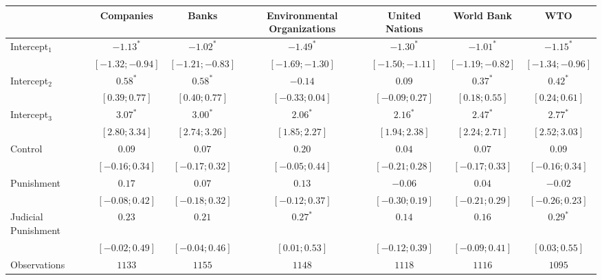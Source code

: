 \begin{table}[h]
\begin{center}
\begin{threeparttable}
\begin{tabular}{l c c c c c c}
\hline
 & Companies & Banks & Environmental Organizations & United Nations & World Bank & WTO \\
\hline
Intercept$_1$       & $-1.13^{*}$       & $-1.02^{*}$       & $-1.49^{*}$       & $-1.30^{*}$       & $-1.01^{*}$       & $-1.15^{*}$       \\
                    & $ [-1.32; -0.94]$ & $ [-1.21; -0.83]$ & $ [-1.69; -1.30]$ & $ [-1.50; -1.11]$ & $ [-1.19; -0.82]$ & $ [-1.34; -0.96]$ \\
Intercept$_2$       & $0.58^{*}$        & $0.58^{*}$        & $-0.14$           & $0.09$            & $0.37^{*}$        & $0.42^{*}$        \\
                    & $ [ 0.39;  0.77]$ & $ [ 0.40;  0.77]$ & $ [-0.33;  0.04]$ & $ [-0.09;  0.27]$ & $ [ 0.18;  0.55]$ & $ [ 0.24;  0.61]$ \\
Intercept$_3$       & $3.07^{*}$        & $3.00^{*}$        & $2.06^{*}$        & $2.16^{*}$        & $2.47^{*}$        & $2.77^{*}$        \\
                    & $ [ 2.80;  3.34]$ & $ [ 2.74;  3.26]$ & $ [ 1.85;  2.27]$ & $ [ 1.94;  2.38]$ & $ [ 2.24;  2.71]$ & $ [ 2.52;  3.03]$ \\
Control             & $0.09$            & $0.07$            & $0.20$            & $0.04$            & $0.07$            & $0.09$            \\
                    & $ [-0.16;  0.34]$ & $ [-0.17;  0.32]$ & $ [-0.05;  0.44]$ & $ [-0.21;  0.28]$ & $ [-0.17;  0.33]$ & $ [-0.16;  0.34]$ \\
Punishment          & $0.17$            & $0.07$            & $0.13$            & $-0.06$           & $0.04$            & $-0.02$           \\
                    & $ [-0.08;  0.42]$ & $ [-0.18;  0.32]$ & $ [-0.12;  0.37]$ & $ [-0.30;  0.19]$ & $ [-0.21;  0.29]$ & $ [-0.26;  0.23]$ \\
Judicial Punishment & $0.23$            & $0.21$            & $0.27^{*}$        & $0.14$            & $0.16$            & $0.29^{*}$        \\
                    & $ [-0.02;  0.49]$ & $ [-0.04;  0.46]$ & $ [ 0.01;  0.53]$ & $ [-0.12;  0.39]$ & $ [-0.09;  0.41]$ & $ [ 0.03;  0.55]$ \\
\hline
Observations        & $1133$            & $1155$            & $1148$            & $1118$            & $1116$            & $1095$            \\

\end{tabular}
\end{threeparttable}
\end{center}
\end{table}
